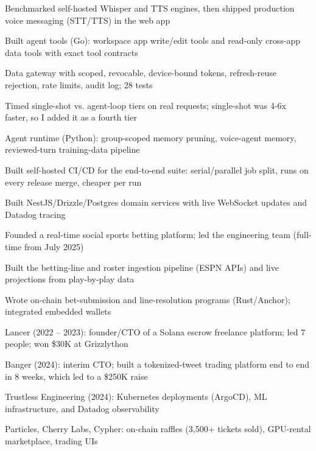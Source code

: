 \documentclass[print]{jack-resume}
\begin{document}
\begin{tightemize}
    \item Benchmarked self-hosted Whisper and TTS engines, then shipped production voice messaging (STT/TTS) in the web app
    \item Built agent tools (Go): workspace app write/edit tools and read-only cross-app data tools with exact tool contracts
    \item Data gateway with scoped, revocable, device-bound tokens, refresh-reuse rejection, rate limits, audit log; 28 tests
    \item Timed single-shot vs. agent-loop tiers on real requests; single-shot was 4-6x faster, so I added it as a fourth tier
    \item Agent runtime (Python): group-scoped memory pruning, voice-agent memory, reviewed-turn training-data pipeline
    \item Built self-hosted CI/CD for the end-to-end suite: serial/parallel job split, runs on every release merge, cheaper per run
\end{tightemize}
\sectionsep

\begin{tightemize}
    \item Built NestJS/Drizzle/Postgres domain services with live WebSocket updates and Datadog tracing
    \item Founded a real-time social sports betting platform; led the engineering team (full-time from July 2025)
    \item Built the betting-line and roster ingestion pipeline (ESPN APIs) and live projections from play-by-play data
    \item Wrote on-chain bet-submission and line-resolution programs (Rust/Anchor); integrated embedded wallets
\end{tightemize}
\sectionsep

\begin{tightemize}
    \item Lancer (2022 – 2023): founder/CTO of a Solana escrow freelance platform; led 7 people; won \$30K at Grizzlython
    \item Banger (2024): interim CTO; built a tokenized-tweet trading platform end to end in 8 weeks, which led to a \$250K raise
    \item Trustless Engineering (2024): Kubernetes deployments (ArgoCD), ML infrastructure, and Datadog observability
    \item Particles, Cherry Labs, Cypher: on-chain raffles (3,500+ tickets sold), GPU-rental marketplace, trading UIs
\end{tightemize}
\sectionsep
\end{document}
